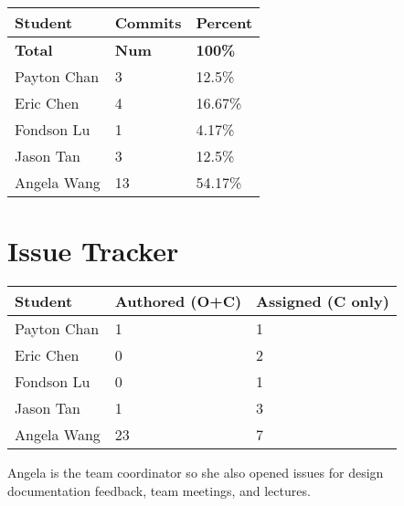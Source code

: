 \documentclass{article}
\begin{document}
\begin{table}[H]
\centering
\begin{tabular}{lll}
\toprule
\textbf{Student} & \textbf{Commits} & \textbf{Percent}\\
\midrule
\textbf{Total} & \textbf{Num} & \textbf{100\%} \\
Payton Chan & 3 & 12.5\%\\
Eric Chen & 4 & 16.67\%\\
Fondson Lu & 1 & 4.17\%\\
Jason Tan & 3 & 12.5\%\\
Angela Wang & 13 & 54.17\%\\
\bottomrule
\end{tabular}
\end{table}

\section{Issue Tracker}

\begin{table}[H]
\centering
\begin{tabular}{lll}
\toprule
\textbf{Student} & \textbf{Authored (O+C)} & \textbf{Assigned (C only)}\\
\midrule
Payton Chan & 1 & 1\\
Eric Chen & 0 & 2\\
Fondson Lu & 0 & 1\\
Jason Tan & 1 & 3\\
Angela Wang & 23 & 7\\
\bottomrule
\end{tabular}
\end{table}

Angela is the team coordinator so she also opened issues for design
documentation feedback, team meetings, and lectures.
\end{document}
